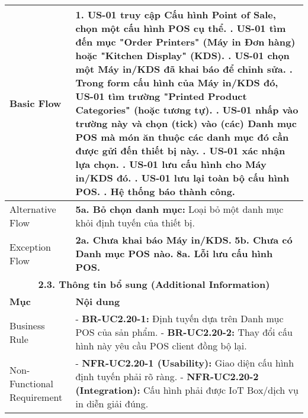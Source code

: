 \begin{longtable}{|m{4cm}|p{11cm}|}
Basic Flow & 1. US-01 truy cập Cấu hình Point of Sale, chọn một cấu hình POS cụ thể. \newline 2. US-01 tìm đến mục "Order Printers" (Máy in Đơn hàng) hoặc "Kitchen Display" (KDS). \newline 3. US-01 chọn một Máy in/KDS đã khai báo để chỉnh sửa. \newline 4. Trong form cấu hình của Máy in/KDS đó, US-01 tìm trường "Printed Product Categories" (hoặc tương tự). \newline 5. US-01 nhấp vào trường này và chọn (tick) vào (các) Danh mục POS mà món ăn thuộc các danh mục đó cần được gửi đến thiết bị này. \newline 6. US-01 xác nhận lựa chọn. \newline 7. US-01 lưu cấu hình cho Máy in/KDS đó. \newline 8. US-01 lưu lại toàn bộ cấu hình POS. \newline 9. Hệ thống báo thành công. \\
\hline
Alternative Flow & \textbf{5a. Bỏ chọn danh mục:} Loại bỏ một danh mục khỏi định tuyến của thiết bị. \\
\hline
Exception Flow & \textbf{2a. Chưa khai báo Máy in/KDS.} \newline \textbf{5b. Chưa có Danh mục POS nào.} \newline \textbf{8a. Lỗi lưu cấu hình POS.} \\
\hline
\multicolumn{2}{|c|}{\textbf{2.3. Thông tin bổ sung (Additional Information)}} \\
\hline
\textbf{Mục} & \textbf{Nội dung} \\
\hline
Business Rule & - \textbf{BR-UC2.20-1:} Định tuyến dựa trên Danh mục POS của sản phẩm. \newline - \textbf{BR-UC2.20-2:} Thay đổi cấu hình này yêu cầu POS client đồng bộ lại. \\
\hline
Non-Functional Requirement & - \textbf{NFR-UC2.20-1 (Usability):} Giao diện cấu hình định tuyến phải rõ ràng. \newline - \textbf{NFR-UC2.20-2 (Integration):} Cấu hình phải được IoT Box/dịch vụ in diễn giải đúng. \\
\hline
\end{longtable}

